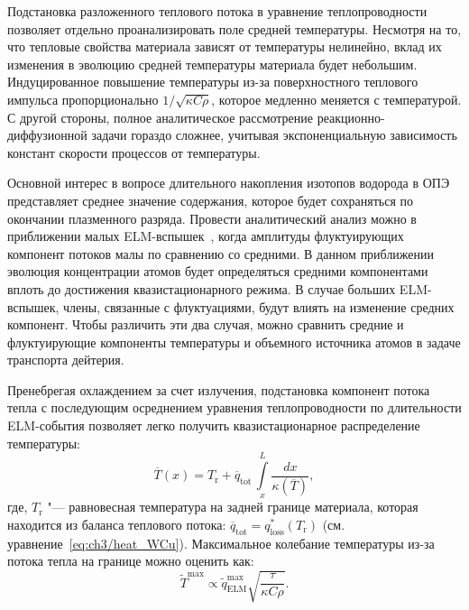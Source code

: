 Подстановка разложенного теплового потока в уравнение теплопроводности позволяет отдельно проанализировать поле средней температуры. Несмотря на то, что тепловые свойства материала зависят от температуры нелинейно, вклад их изменения в эволюцию средней температуры материала будет небольшим. Индуцированное повышение температуры из-за поверхностного теплового импульса пропорционально $1/\sqrt{\kappa C \rho}$, которое медленно меняется с температурой. С другой стороны, полное аналитическое рассмотрение реакционно-диффузионной задачи гораздо сложнее, учитывая экспоненциальную зависимость констант скорости процессов от температуры.

\begin{comment}
	 В случае переноса тепла требуем: \( \underset{t}{\max} \, |\widetilde{q}_{\mathrm{ELM}}| \ll \overline{q}_{\mathrm{tot}} \), где \( \overline{q}_{\mathrm{tot}} = q_\mathrm{stat} + \overline{q}_{\mathrm{ELM}} \). Для задачи транспорта дейтерия необходимо, чтобы амплитуда изменения флуктуирующей части объемного источника атомов была мала: \( \underset{t}{\max} \, |\widetilde{S}_{\mathrm{ELM}}| \ll \overline{S}_{\mathrm{tot}} \), где \( \overline{S}_{\mathrm{tot}} = S_\mathrm{stat} + \overline{S}_{\mathrm{ELM}} \).
\end{comment}

Основной интерес в вопросе длительного накопления изотопов водорода в ОПЭ представляет среднее значение содержания, которое будет сохраняться по окончании плазменного разряда. Провести аналитический анализ можно в приближении малых ELM-вспышек~\cite{Marenkov2012a}, когда амплитуды флуктуирующих компонент потоков малы по сравнению со средними. В данном приближении эволюция концентрации атомов будет определяться средними компонентами вплоть до достижения квазистационарного режима. В случае больших ELM-вспышек, члены, связанные с флуктуациями, будут влиять на изменение средних компонент. Чтобы различить эти два случая, можно сравнить средние и флуктуирующие компоненты температуры и объемного источника атомов в задаче транспорта дейтерия.

Пренебрегая охлаждением за счет излучения, подстановка компонент потока тепла с последующим осреднением уравнения теплопроводности по длительности ELM-события позволяет легко получить квазистационарное распределение температуры:
\begin{equation}
	\label{eq:ch3/temp_av}
	\overline{T}(x)=T_\mathrm{r}+\overline{q}_{\mathrm{tot}}\,\int\limits_x^L\frac{dx}{\kappa(\overline{T})},
\end{equation}
где, $T_\mathrm{r}$ "--- равновесная температура на задней границе материала, которая находится из баланса теплового потока: $\overline{q}_{\mathrm{tot}}=q_{\mathrm{loss}}^*(T_\mathrm{r})$ (см. уравнение~\cref{eq:ch3/heat_WCu}). Максимальное колебание температуры из-за потока тепла на границе можно оценить как:
\begin{equation}
	\label{eq:ch3/temp_fluct}
	\widetilde{T}^{\max} \propto \widetilde{q}_{\mathrm{ELM}}^{\max} \sqrt{\frac{\tau}{\kappa C \rho}}.
\end{equation} 

